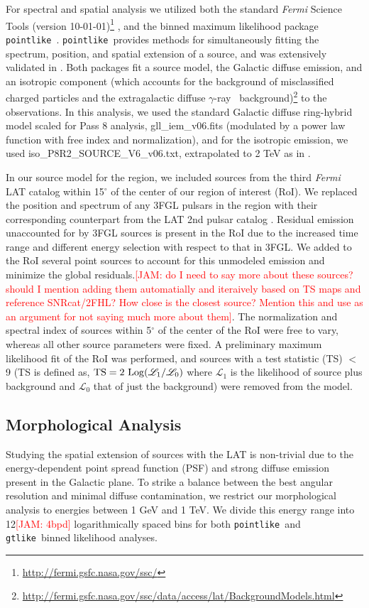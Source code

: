 \documentclass[preprint2]{aastex}
\newcommand{\kibitz}[2]{\ifnum\Comments=1\textcolor{#1}{#2}\fi}
\newcommand{\jamie}[1]{\kibitz{red}      {[JAM: #1]}}
\newcommand{\gam}{$\gamma$-ray}
\newcommand{\Fermi}{\emph{Fermi }}  %
\newcommand{\FermiLat}{\emph{Fermi} LAT }     %
\newcommand{\ptlike}{{\tt pointlike}}
\newcommand{\gtlike}{{\tt gtlike}}
\begin{document}
For spectral and spatial analysis we utilized both the standard \Fermi Science Tools (version 10-01-01)\footnote[1]{\url{http://fermi.gsfc.nasa.gov/ssc/}} , and the binned maximum likelihood package \ptlike~\citep{Kerr10}. \ptlike~provides methods for simultaneously fitting the spectrum, position, and spatial extension of a source, and was extensively validated in \cite{Lande12}. Both packages fit a source model, the Galactic diffuse emission, and an isotropic component (which accounts for the background of misclassified charged particles and the extragalactic diffuse \gam~ background)\footnote[2]{\url{http://fermi.gsfc.nasa.gov/ssc/data/access/lat/BackgroundModels.html}} to the observations. In this analysis, we used the standard Galactic diffuse ring-hybrid model scaled for Pass 8 analysis, gll{\_}iem{\_}v06.fits (modulated by a power law function with free index and normalization), and for the isotropic emission,  we used iso{\_}P8R2{\_}SOURCE{\_}V6{\_}v06.txt, extrapolated to 2 TeV as in \cite{2FHL}.

In our source model for the region, we included sources from the third \FermiLat catalog \citep[3FGL]{3FGL} within 15$^\circ$ of the center of our region of interest (RoI). We replaced the position and spectrum of any 3FGL pulsars in the region with their corresponding counterpart  from the LAT 2nd pulsar catalog \citep{2PC}.  Residual emission unaccounted for by 3FGL sources is present in the RoI due to the increased time range and different energy selection with respect to that in 3FGL. We added to the RoI several point sources to account for this unmodeled emission and minimize the global residuals.\jamie{do I need to say more about these sources? should I mention adding them automatially and iteraively based on TS maps and reference SNRcat/2FHL? How close is the closest source? Mention this and use as an argument for not saying much more about them}.  The normalization and spectral index of sources within 5$^{\circ}$ of the center of the RoI were free to vary, whereas all other source parameters were fixed. A preliminary maximum likelihood fit of the RoI was performed, and  sources with a test statistic (TS) $<$ 9 (TS is defined as,  ${\rm TS}=2~{\rm Log}(\mathcal{L}_1 / \mathcal{L}_0)$ where $\mathcal{L}_1$ 
 is the likelihood of source plus background and  $\mathcal{L}_0$ that of just the background) were removed from the model. 

\subsection{\label{sec:LATmorph}Morphological Analysis}
Studying the spatial extension of sources with the LAT is non-trivial due to the energy-dependent point spread function (PSF) and strong diffuse emission present in the Galactic plane. To strike a balance between the best angular resolution and minimal diffuse contamination, we restrict our morphological analysis to energies between 1 GeV and  1 TeV. We divide this energy range into 12\jamie{4bpd} logarithmically spaced bins for both \ptlike~and \gtlike~binned likelihood analyses. 
\end{document}
